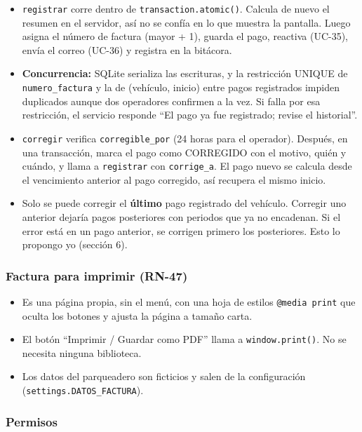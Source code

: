 \begin{itemize}
  \item \texttt{registrar} corre dentro de \texttt{transaction.atomic()}. Calcula de nuevo el resumen en el servidor, así no se confía en lo que muestra la pantalla. Luego asigna el número de factura (mayor + 1), guarda el pago, reactiva (UC-35), envía el correo (UC-36) y registra en la bitácora.
  \item \textbf{Concurrencia:} SQLite serializa las escrituras, y la restricción UNIQUE de \texttt{numero\_factura} y la de (vehículo, inicio) entre pagos registrados impiden duplicados aunque dos operadores confirmen a la vez. Si falla por esa restricción, el servicio responde ``El pago ya fue registrado; revise el historial''.
  \item \texttt{corregir} verifica \texttt{corregible\_por} (24 horas para el operador). Después, en una transacción, marca el pago como CORREGIDO con el motivo, quién y cuándo, y llama a \texttt{registrar} con \texttt{corrige\_a}. El pago nuevo se calcula desde el vencimiento anterior al pago corregido, así recupera el mismo inicio.
  \item Solo se puede corregir el \textbf{último} pago registrado del vehículo. Corregir uno anterior dejaría pagos posteriores con periodos que ya no encadenan. Si el error está en un pago anterior, se corrigen primero los posteriores. Esto lo propongo yo (sección 6).
\end{itemize}

\subsubsection{Factura para imprimir (RN-47)}

\begin{itemize}
  \item Es una página propia, sin el menú, con una hoja de estilos \texttt{@media print} que oculta los botones y ajusta la página a tamaño carta.
  \item El botón ``Imprimir / Guardar como PDF'' llama a \texttt{window.print()}. No se necesita ninguna biblioteca.
  \item Los datos del parqueadero son ficticios y salen de la configuración (\texttt{settings.DATOS\_FACTURA}).
\end{itemize}

\subsubsection{Permisos}

